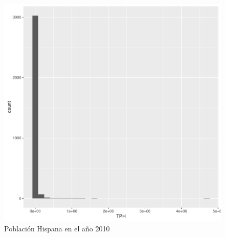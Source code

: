 \documentclass[conference]{IEEEtran}\usepackage[]{graphicx}\usepackage[]{color}
\makeatletter
\def\maxwidth{ %
  \ifdim\Gin@nat@width>\linewidth
    \linewidth
  \else
    \Gin@nat@width
  \fi
}
\newenvironment{knitrout}{}{} %
\makeatother
\begin{document}
\begin{figure}[H]
	\centering
\begin{knitrout}
\color{fgcolor}
\includegraphics[width=\maxwidth]{figure/pobHisp2010-1} 

\end{knitrout}
	\caption{Población Hispana en el año 2010}
\end{figure}
\end{document}
